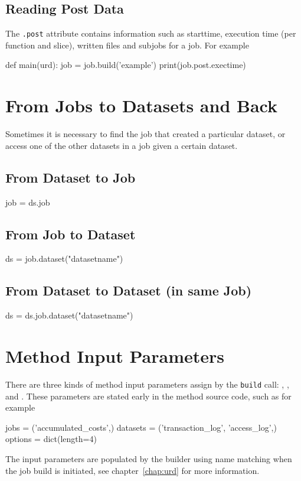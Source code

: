 \subsection{Reading Post Data}
The \texttt{.post} attribute contains information such as starttime,
execution time (per function and slice), written files and subjobs for
a job.  For example
\begin{python}
def main(urd):
    job = job.build('example')
    print(job.post.exectime)
\end{python}



\section{From Jobs to Datasets and Back}
Sometimes it is necessary to find the job that created a particular
dataset, or access one of the other datasets in a job given a certain
dataset.


\subsection{From Dataset to Job}
\begin{python}
  job = ds.job
\end{python}


\subsection{From Job to Dataset}
\begin{python}
  ds = job.dataset("datasetname")
\end{python}


\subsection{From Dataset to Dataset (in same Job)}
\begin{python}
  ds = ds.job.dataset("datasetname")
\end{python}




\section{Method Input Parameters}
\label{sec:input_params}

There are three kinds of method input parameters assign by
the \texttt{build} call: \jobs, \datasets, and \options.  These
parameters are stated early in the method source code, such as for
example
\begin{python}
jobs = ('accumulated_costs',)
datasets = ('transaction_log', 'access_log',)
options = dict(length=4)
\end{python}
The input parameters are populated by the builder using name matching
when the job build is initiated, see chapter~\ref{chap:urd} for more
information.

